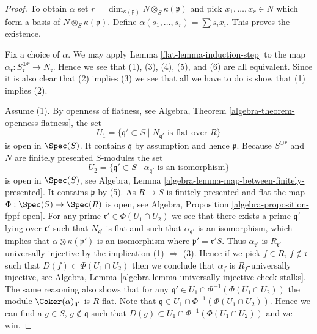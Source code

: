 \begin{proof}

To obtain $\alpha$ set
$r = \dim_{\kappa(\mathfrak p)} N \otimes_S \kappa(\mathfrak p)$ and pick
$x_1, \ldots, x_r \in N$ which form a basis of
$N \otimes_S \kappa(\mathfrak p)$. Define
$\alpha(s_1, \ldots, s_r) = \sum s_i x_i$. This proves the existence.

\medskip\noindent
Fix a choice of $\alpha$.
We may apply
Lemma \ref{flat-lemma-induction-step}
to the map
$\alpha_{\mathfrak r} : S_{\mathfrak r}^{\oplus r} \to N_{\mathfrak r}$.
Hence we see that (1), (3), (4), (5), and (6) are all equivalent.
Since it is also clear that (2) implies (3) we see that all we have to
do is show that (1) implies (2).

\medskip\noindent
Assume (1). By openness of flatness, see
Algebra, Theorem \ref{algebra-theorem-openness-flatness},
the set
$$
U_1 = \{\mathfrak q' \subset S \mid N_{\mathfrak q'}\text{ is flat over }R\}
$$
is open in $\Spec(S)$. It contains $\mathfrak q$ by assumption
and hence $\mathfrak p$. Because $S^{\oplus r}$ and $N$ are finitely presented
$S$-modules the set
$$
U_2 = \{\mathfrak q' \subset S \mid
\alpha_{\mathfrak q'}\text{ is an isomorphism}\}
$$
is open in $\Spec(S)$, see
Algebra, Lemma \ref{algebra-lemma-map-between-finitely-presented}.
It contains $\mathfrak p$ by (5). As $R \to S$
is finitely presented and flat the map
$\Phi : \Spec(S) \to \Spec(R)$ is open, see
Algebra, Proposition \ref{algebra-proposition-fppf-open}.
For any prime $\mathfrak r' \in \Phi(U_1 \cap U_2)$ we see that
there exists a prime $\mathfrak q'$ lying over $\mathfrak r'$ such that
$N_{\mathfrak q'}$ is flat and such that $\alpha_{\mathfrak q'}$ is
an isomorphism, which implies that $\alpha \otimes \kappa(\mathfrak p')$
is an isomorphism where $\mathfrak p' = \mathfrak r' S$. Thus
$\alpha_{\mathfrak r'}$ is $R_{\mathfrak r'}$-universally injective
by the implication (1) $\Rightarrow$ (3).
Hence if we pick $f \in R$, $f \not \in \mathfrak r$ such that
$D(f) \subset \Phi(U_1 \cap U_2)$ then we conclude that
$\alpha_f$ is $R_f$-universally injective, see
Algebra, Lemma \ref{algebra-lemma-universally-injective-check-stalks}.
The same reasoning also shows that for any
$\mathfrak q' \in U_1 \cap \Phi^{-1}(\Phi(U_1 \cap U_2))$
the module $\Coker(\alpha)_{\mathfrak q'}$ is $R$-flat.
Note that $\mathfrak q \in U_1 \cap \Phi^{-1}(\Phi(U_1 \cap U_2))$.
Hence we can find a $g \in S$, $g \not \in \mathfrak q$ such
that $D(g) \subset U_1 \cap \Phi^{-1}(\Phi(U_1 \cap U_2))$
and we win.
\end{proof}

